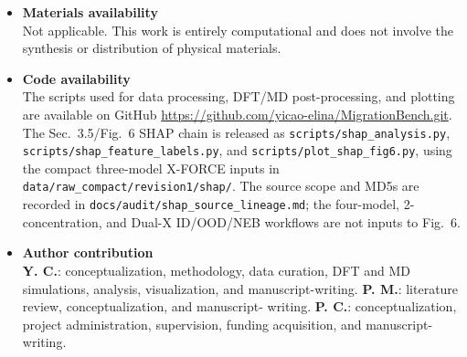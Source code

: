 \documentclass[pdflatex,sn-mathphys-num]{sn-jnl}%
\providecommand{\reviewermap}[3]{}
\theoremstyle{thmstyleone}%
\theoremstyle{thmstyletwo}%
\theoremstyle{thmstylethree}%
\begin{document}
\begin{itemize}
  \item \textbf{Materials availability} \\
  Not applicable. This work is entirely computational and does not involve the synthesis or distribution of physical materials.

  \item \textbf{Code availability} \\
\reviewermap{REV-C8/REV-C13}{done-local}{The code release includes the fail-closed zero-force exporter fix, frame-level provenance audit, and X-FORCE-derived SHAP release.}
  The scripts used for data processing, DFT/MD post-processing, and plotting are available on GitHub \url{https://github.com/yicao-elina/MigrationBench.git}. The Sec.~3.5/Fig.~6 SHAP chain is released as \texttt{scripts/shap\_analysis.py}, \texttt{scripts/shap\_feature\_labels.py}, and \texttt{scripts/plot\_shap\_fig6.py}, using the compact three-model X-FORCE inputs in \texttt{data/raw\_compact/revision1/shap/}. The source scope and MD5s are recorded in \texttt{docs/audit/shap\_source\_lineage.md}; the four-model, 2-concentration, and Dual-X ID/OOD/NEB workflows are not inputs to Fig.~6.

  \item \textbf{Author contribution} \\
    \textbf{Y. C.}: conceptualization, methodology, data curation, DFT and MD simulations, analysis, visualization, and manuscript-writing. \textbf{P. M.}: literature review, conceptualization, and manuscript- writing. \textbf{P. C.}: conceptualization, project administration, supervision, funding acquisition, and manuscript-writing.
\end{itemize}



% 



\end{document}
